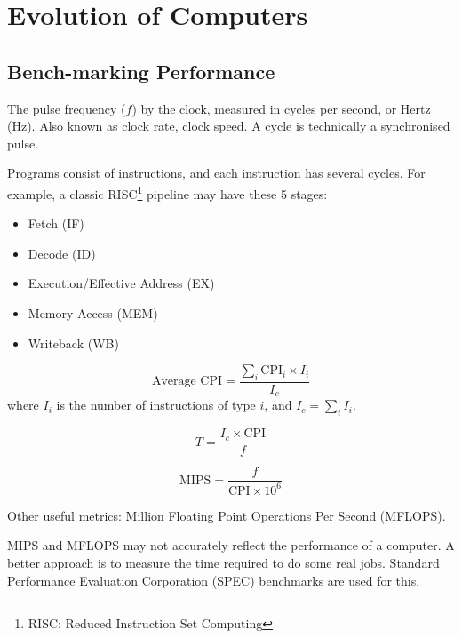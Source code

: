 \section{Evolution of Computers}

\subsection{Bench-marking Performance}

\begin{definition}
    The pulse frequency ($f$) by the clock, measured in cycles per
    second, or Hertz (Hz). Also known as clock rate, clock speed.
    A cycle is technically a synchronised pulse.
\end{definition}

Programs consist of instructions, and each instruction has several cycles.
For example, a classic RISC\footnote{RISC: Reduced Instruction Set Computing} pipeline
may have these 5 stages:
\begin{itemize}
    \item Fetch (IF)
    \item Decode (ID)
    \item Execution/Effective Address (EX)
    \item Memory Access (MEM)
    \item Writeback (WB)
\end{itemize}

\begin{definition} \label{def:average-cpi}
\begin{equation*}
    \text{Average CPI} = \frac{\sum_i \text{CPI}_i\times I_i}{I_c}
\end{equation*}
where $I_i$ is the number of instructions of type $i$, and $I_c = \sum_i I_i$.
\end{definition}

\begin{definition}\label{def:processor-time}
\begin{equation*}
    T = \frac{I_c \times \text{CPI}}{f}
\end{equation*}
\end{definition}

\begin{definition}\label{def:mips}
\begin{equation*}
    \text{MIPS} = \frac{f}{\text{CPI}\times 10^6}
\end{equation*}
\end{definition}

Other useful metrics: Million Floating Point Operations Per Second (MFLOPS).

\begin{remark}
    MIPS and MFLOPS may not accurately reflect the performance of a computer.
    A better approach is to measure the time required to do some real jobs.
    Standard Performance Evaluation Corporation (SPEC) benchmarks are used for this.
\end{remark}